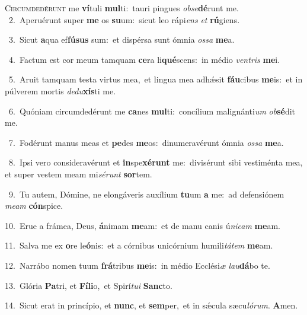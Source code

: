 \lettrine{\initial\textcolor{\initialcolor}{C}}{ircumdedérunt} me \textbf{ví}\-tuli \textbf{mul}\-ti:~\star tauri pingues \textit{ob}\-\textit{se}\textbf{dé}runt me.\\
{\numbfont\textcolor{\numbcolor}{~2.}}~Aperuérunt super \textbf{me} os \textbf{su}\-um:~\star sicut leo rápi\textit{ens} \textit{et} \textbf{rú}\-giens.\par
{\numbfont\textcolor{\numbcolor}{~3.}}~Sicut \textbf{a}\-qua ef\-\textbf{fú}\-\textbf{sus} sum:~\star et dispérsa sunt ómnia \textit{os}\-\textit{sa} \textbf{me}\-a.\par
{\numbfont\textcolor{\numbcolor}{~4.}}~Factum est cor meum tamquam \textbf{ce}\-ra li\-\textbf{qué}\-scens:~\star in médio \textit{ven}\-\textit{tris} \textbf{me}\-i.\par
{\numbfont\textcolor{\numbcolor}{~5.}}~Aruit tamquam testa virtus mea,~\dagger et lingua mea adhǽsit \textbf{fáu}\-cibus \textbf{me}\-is:~\star et in púlverem mortis \textit{de}\-\textit{du}\textbf{xís}ti me.\par
{\numbfont\textcolor{\numbcolor}{~6.}}~Quóniam circumdedérunt me \textbf{ca}\-nes \textbf{mul}\-ti:~\star concílium malignánti\textit{um} \textit{ob}\-\textbf{sé}dit me.\par
{\numbfont\textcolor{\numbcolor}{~7.}}~Fodérunt manus meas et \textbf{pe}\-des \textbf{me}\-os:~\star dinumeravérunt ómnia \textit{os}\-\textit{sa} \textbf{me}\-a.\par
{\numbfont\textcolor{\numbcolor}{~8.}}~Ipsi vero consideravérunt et \textbf{in}\-spe\-\textbf{xé}\-\textbf{runt} me:~\star divisérunt sibi vestiménta mea, et super vestem meam mi\-\textit{sé}\-\textit{runt} \textbf{sor}\-tem.\par
{\numbfont\textcolor{\numbcolor}{~9.}}~Tu autem, Dómine, ne elongáveris auxílium \textbf{tu}\-um \textbf{a} me:~\star ad defensiónem \textit{me}\-\textit{am} \textbf{cón}\-spice.\par
{\numbfont\textcolor{\numbcolor}{10.}}~Erue a frámea, Deus, \textbf{á}\-nimam \textbf{me}\-am:~\star et de manu canis ú\-\textit{ni}\-\textit{cam} \textbf{me}\-am.\par
{\numbfont\textcolor{\numbcolor}{11.}}~Salva me ex \textbf{o}\-re le\-\textbf{ó}\-nis:~\star et a córnibus unicórnium humili\-\textit{tá}\-\textit{tem} \textbf{me}\-am.\par
{\numbfont\textcolor{\numbcolor}{12.}}~Narrábo nomen tuum \textbf{frá}\-tribus \textbf{me}\-is:~\star in médio Ecclési\textit{æ} \textit{lau}\-\textbf{dá}bo te.\par
{\numbfont\textcolor{\numbcolor}{13.}}~Glória \textbf{Pa}\-tri, et \textbf{Fí}\-\textbf{li}o,~\star et Spirí\-\textit{tu}\-\textit{i} \textbf{Sanc}\-to.\par
{\numbfont\textcolor{\numbcolor}{14.}}~Sicut erat in princípio, et \textbf{nunc}\-, et \textbf{sem}\-per,~\star et in sǽcula sæcu\-\textit{ló}\-\textit{rum}. \textbf{A}\-men.\par
